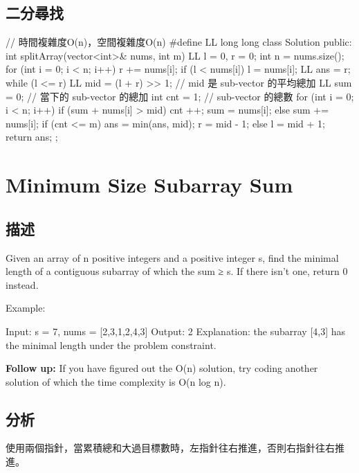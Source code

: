 \subsection{二分尋找}
\begin{Code}
// 時間複雜度O(n)，空間複雜度O(n)
#define LL long long
class Solution {
public:
    int splitArray(vector<int>& nums, int m) {
        LL l = 0, r = 0;
        int n = nums.size();
        for (int i = 0; i < n; i++) {
            r += nums[i];
            if (l < nums[i]) {
                l = nums[i];
            }
        }
        LL ans =  r;
        while (l <= r) {
            LL mid = (l + r) >> 1; // mid 是 sub-vector 的平均總加
            LL sum = 0; // 當下的 sub-vector 的總加
            int cnt = 1; // sub-vector 的總數
            for (int i = 0; i < n; i++) {
                if (sum + nums[i] > mid) {
                    cnt ++;
                    sum = nums[i];
                } else {
                    sum += nums[i];
                }
            }
            if (cnt <= m) {
                ans = min(ans, mid);
                r = mid - 1;
            } else {
                l = mid + 1;
            }
        }
        return ans;
    }
};
\end{Code}

\section{Minimum Size Subarray Sum}
\label{sec:minimum-size-subarray-sum}

\subsection{描述}
Given an array of n positive integers and a positive integer s, find the minimal length of a contiguous subarray of which the sum ≥ s. If there isn't one, return 0 instead.

Example:
\begin{Code}
Input: s = 7, nums = [2,3,1,2,4,3]
Output: 2
Explanation: the subarray [4,3] has the minimal length under the problem constraint.
\end{Code}

\textbf{Follow up:}\newline
If you have figured out the O(n) solution, try coding another solution of which the time complexity is O(n log n). 

\subsection{分析}
使用兩個指針，當累積總和大過目標數時，左指針往右推進，否則右指針往右推進。

